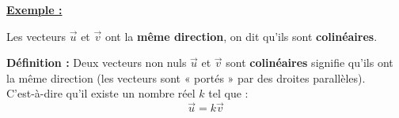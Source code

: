 \documentclass[12pt]{article}
\begin{document}
\vspace{5pt}

\underline{\textbf{Exemple :}}

\begin{minipage}[t]{.40\textwidth}%
    \vspace{5pt}
    Les vecteurs $\overrightarrow{u}$ et $\overrightarrow{v}$ ont la \textbf{même direction}, 
    on dit qu'ils sont
    \textbf{colinéaires}.
\end{minipage}%
\hfill
\begin{minipage}[t]{.55\textwidth}%
    \vspace{0pt}
    \begin{center}

    \end{center}
\end{minipage}%

\vspace{10pt}

\begin{mdframed}[
    linewidth=1pt,
    roundcorner=5pt,
    linecolor=ForestGreen,
    innerbottommargin=10pt,
    innertopmargin=10pt
]
{\color{ForestGreen}\textbf{Définition :}}
Deux vecteurs non nuls $\overrightarrow{u}$ et $\overrightarrow{v}$ sont \textbf{colinéaires} signifie 
qu'ils ont la même direction (les vecteurs sont « portés » par des droites parallèles).
\vspace{5pt}\\C'est-à-dire qu'il existe un nombre réel $k$ tel que :
\[
\overrightarrow{u} = k\overrightarrow{v}
\]
\end{mdframed}
\end{document}
